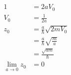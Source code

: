\documentclass{article}
\begin{document}
\subsection{}

\begin{align*}
  1                          & = 2 a V_0                            \\
  V_0                        & = \frac{1}{2 a}                      \\
  z_0                        & = \frac{a}{\hbar} \sqrt{2 m V_0}     \\
                             & = \frac{a}{\hbar} \sqrt{\frac{m}{a}} \\
                             & = \frac{\sqrt{a m}}{\hbar}           \\
  \lim_{a \rightarrow 0} z_0 & = 0                                  \\
\end{align*}

\setcounter{subsection}{33}
\subsection{}
\end{document}
